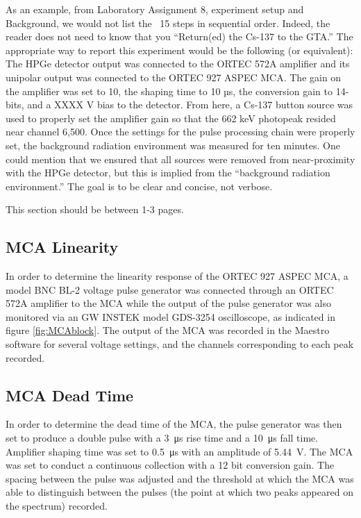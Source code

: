\documentclass[12pt]{article}
\begin{document}
As an example, from Laboratory Assignment 8, experiment setup and Background, we would not list the ~15 steps in sequential order. Indeed, the reader does not need to know that you “Return(ed) the Cs-137 to the GTA.” The appropriate way to report this experiment would be the following (or equivalent): The HPGe detector output was connected to the ORTEC 572A amplifier and its unipolar output was connected to the ORTEC 927 ASPEC MCA. The gain on the amplifier was set to 10, the shaping time to 10 µs, the conversion gain to 14-bits, and a XXXX V bias to the detector. From here, a Cs-137 button source was used to properly set the amplifier gain so that the 662 keV photopeak resided near channel 6,500. Once the settings for the pulse processing chain were properly set, the background radiation environment was measured for ten minutes. One could mention that we ensured that all sources were removed from near-proximity with the HPGe detector, but this is implied from the “background radiation environment.” The goal is to be clear and concise, not verbose. 

This section should be between 1-3 pages.

\subsection{MCA Linearity}
In order to determine the linearity response of the ORTEC 927 ASPEC MCA, a model BNC BL-2 voltage pulse generator was connected through an ORTEC 572A amplifier to the MCA while the output of the pulse generator was also monitored via an GW INSTEK model GDS-3254 oscilloscope, as indicated in figure \ref{fig:MCAblock}. The output of the MCA was recorded in the Maestro software for several voltage settings, and the channels corresponding to each peak recorded.

\subsection{MCA Dead Time}
In order to determine the dead time of the MCA, the pulse generator was then set to produce a double pulse with a \SI{3}{\micro\second} rise time and a \SI{10}{\micro\second} fall time. Amplifier shaping time was set to \SI{0.5}{\micro\second} with an amplitude of \SI{5.44}{\volt}. The MCA was set to conduct a continuous collection with a 12 bit conversion gain. The spacing between the pulse was adjusted and the threshold at which the MCA was able to distinguish between the pulses (the point at which two peaks appeared on the spectrum) recorded. 
\end{document}

